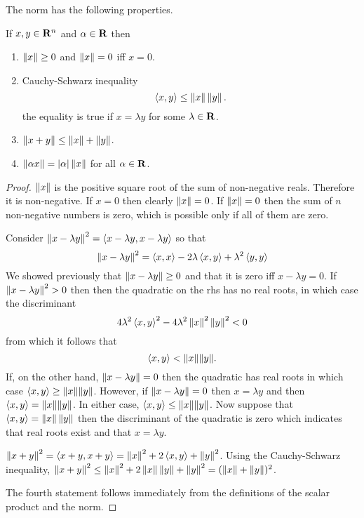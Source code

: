 The norm has the following properties.
\begin{thm}\label{c1s1t1}
If $x, y \in \mathbf{R}^n$ and $\alpha \in \mathbf{R}$ then
\begin{enumerate}
\item $\left\Vert{x}\right\Vert \ge 0$ and $\left\Vert{x}\right\Vert = 0$ iff $x = 0$.
\item Cauchy-Schwarz inequality
\[
\left\langle{x, y}\right\rangle \le \left\Vert{x}\right\Vert\left\Vert{y}\right\Vert.
\]
the equality is true if $x = \lambda y$ for some $\lambda \in \mathbf{R}$.
\item $\left\Vert{x + y}\right\Vert \le \left\Vert{x}\right\Vert + \left\Vert{y}\right\Vert$.
\item $\left\Vert{\alpha x}\right\Vert = \left\vert{\alpha}\right\vert\left\Vert{x}\right\Vert$ for all $\alpha \in \mathbf{R}$.
\end{enumerate}
\end{thm}
\begin{proof}
$\left\Vert{x}\right\Vert$ is the positive square root of the sum of non-negative reals. 
Therefore it is non-negative. If $x = 0$ then clearly $\left\Vert{x}\right\Vert = 0$. If
$\left\Vert{x}\right\Vert = 0$ then the sum of $n$ non-negative numbers is zero, which is
possible only if all of them are zero.

Consider $\left\Vert{x - \lambda y}\right\Vert^2 = \left\langle{x - \lambda y, x - \lambda y}\right\rangle$
so that
\[
\left\Vert{x - \lambda y}\right\Vert^2 = \left\langle{x, x}\right\rangle - 2\lambda\left\langle{x, y}\right\rangle  + \lambda^2\left\langle{y, y}\right\rangle
\]
We showed previously that $\left\Vert{x - \lambda y}\right\Vert \ge 0$ and that it is zero
iff $x - \lambda y = 0$. If $\left\Vert{x - \lambda y}\right\Vert^2 > 0$ then then the quadratic
on the rhs has no real roots, in which case the discriminant
\[
4\lambda^2\left\langle{x, y}\right\rangle^2 - 4\lambda^2\left\Vert{x}\right\Vert^2\left\Vert{y}\right\Vert^2 < 0
\]
from which it follows that
\[
\left\langle{x, y}\right\rangle < {\left\Vert{x}\right\Vert}{\left\Vert{y}\right\Vert}.
\]
If, on the other hand, $\left\Vert{x - \lambda y}\right\Vert = 0$ then the quadratic has real
roots in which case $\left\langle{x, y}\right\rangle \ge {\left\Vert{x}\right\Vert}{\left\Vert{y}\right\Vert}$. However, if $\left\Vert{x -
\lambda y}\right\Vert = 0$ then $x = \lambda y$ and then $\left\langle{x, y}\right\rangle = {\left\Vert{x}\right\Vert}
{\left\Vert{y}\right\Vert}$. In either case, $\left\langle{x, y}\right\rangle \le {\left\Vert{x}\right\Vert} {\left\Vert{y}\right\Vert}$. Now suppose
that $\left\langle{x, y}\right\rangle = \left\Vert{x}\right\Vert\left\Vert{y}\right\Vert$ then the discriminant of the quadratic
is zero which indicates that real roots exist and that $x = \lambda y$.

$\left\Vert{x + y}\right\Vert^2 = \left\langle{x+y, x+y}\right\rangle = \left\Vert{x}\right\Vert^2 + 2\left\langle{x, y}\right\rangle + \left\Vert{y}\right\Vert^2$. Using
the Cauchy-Schwarz inequality, $\left\Vert{x + y}\right\Vert^2 \le \left\Vert{x}\right\Vert^2 + 2\left\Vert{x}\right\Vert
\left\Vert{y}\right\Vert + \left\Vert{y}\right\Vert^2 = (\left\Vert{x}\right\Vert + \left\Vert{y}\right\Vert)^2$.

The fourth statement follows immediately from the definitions of the scalar
product and the norm.
\end{proof}

